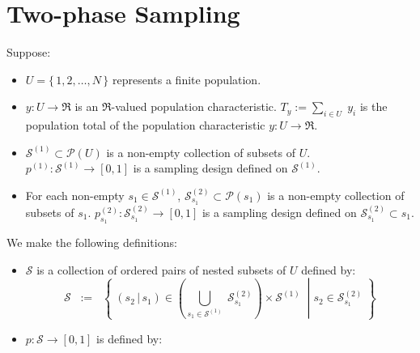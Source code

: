 

\section{Two-phase Sampling}
\setcounter{theorem}{0}
\setcounter{equation}{0}

\renewcommand{\theenumi}{\roman{enumi}}
\renewcommand{\labelenumi}{\textnormal{(\theenumi)}$\;\;$}


\begin{theorem}
\mbox{}\vskip 0.1cm
\noindent
Suppose:
\begin{itemize}
\item
	$U = \{\,1,2,\ldots,N\,\}$ represents a finite population.
\item
	$y : U \longrightarrow \Re$ is an $\Re$-valued population characteristic.
	\vskip 0.1cm
	$T_{y} := \underset{i \in U}{\sum}\;y_{i}$ is the population total of the population characteristic $y : U \longrightarrow \Re$.
\item
	$\mathcal{S}^{(1)} \subset \mathcal{P}(U)$ is a non-empty collection of subsets of $U$.
	\vskip 0.1cm
	$p^{(1)} : \mathcal{S}^{(1)} \longrightarrow [0,1]$ is a sampling design defined on $\mathcal{S}^{(1)}$.
\item
	For each non-empty $s_{1} \in \mathcal{S}^{(1)}$,
	$\mathcal{S}^{(2)}_{s_{1}} \subset \mathcal{P}(s_{1})$ is a non-empty collection of subsets of $s_{1}$.
	\vskip 0.1cm
	$p^{(2)}_{s_{1}} : \mathcal{S}^{(2)}_{s_{1}} \longrightarrow [0,1]$ is a sampling design defined on $\mathcal{S}^{(2)}_{s_{1}} \subset s_{1}$.
\end{itemize}
We make the following definitions:
\begin{itemize}
\item
	$\mathcal{S}$ is a collection of ordered pairs of nested subsets of $U$ defined by:
	\begin{equation*}
	\mathcal{S}
	\;\; := \;\;
		\left\{\;
		\left.
			(s_{2}\,\vert\,s_{1}) \in \left(\underset{s_{1}\in\mathcal{S}^{(1)}}{\bigcup}\; \mathcal{S}^{(2)}_{s_{1}}\right) \times \mathcal{S}^{(1)}
		\;\;\right\vert\;
			s_{2} \in \mathcal{S}^{(2)}_{s_{1}}
		\;\right\}
	\end{equation*}
\item
	$p : \mathcal{S} \longrightarrow [0,1]$ is defined by:
	\begin{equation*}

\end{equation*}
\end{itemize}
\end{theorem}
